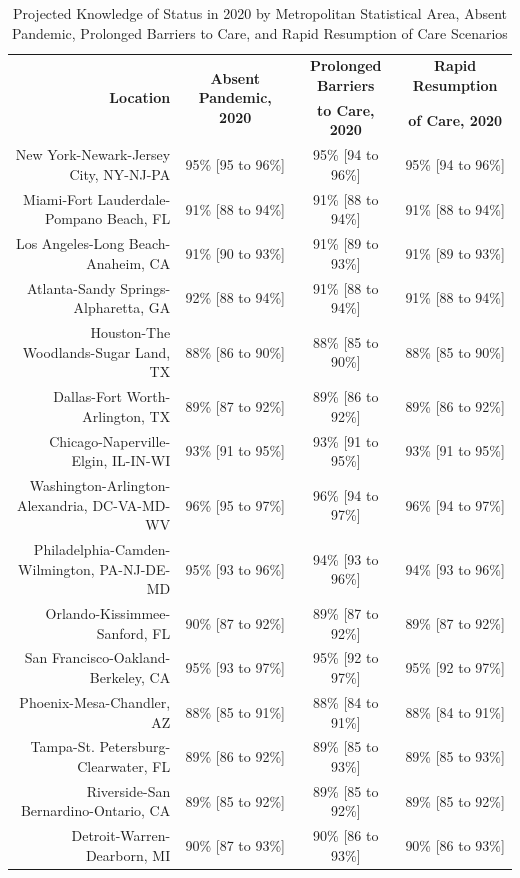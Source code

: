 \documentclass{article}
\begin{document}
\begin{table}[H]
	\caption{Projected Knowledge of Status in 2020 by Metropolitan Statistical Area, Absent Pandemic, Prolonged Barriers to Care, and Rapid Resumption of Care Scenarios}
	\footnotesize
	\begin{tabular}{|r|c|c|c|}
		\hline
		\multirow{2}{*}{\textbf{Location}} & \multirow{2}{*}{\textbf{Absent Pandemic, 2020}} & \textbf{Prolonged Barriers} & \textbf{Rapid Resumption}\\
		&  & \textbf{to Care, 2020} & \textbf{of Care, 2020}\\
		\hline\hline
		New York-Newark-Jersey City, NY-NJ-PA & 95\% [95 to 96\%] & 95\% [94 to 96\%] & 95\% [94 to 96\%]\\
		Miami-Fort Lauderdale-Pompano Beach, FL & 91\% [88 to 94\%] & 91\% [88 to 94\%] & 91\% [88 to 94\%]\\
		Los Angeles-Long Beach-Anaheim, CA & 91\% [90 to 93\%] & 91\% [89 to 93\%] & 91\% [89 to 93\%]\\
		Atlanta-Sandy Springs-Alpharetta, GA & 92\% [88 to 94\%] & 91\% [88 to 94\%] & 91\% [88 to 94\%]\\
		Houston-The Woodlands-Sugar Land, TX & 88\% [86 to 90\%] & 88\% [85 to 90\%] & 88\% [85 to 90\%]\\
		Dallas-Fort Worth-Arlington, TX & 89\% [87 to 92\%] & 89\% [86 to 92\%] & 89\% [86 to 92\%]\\
		Chicago-Naperville-Elgin, IL-IN-WI & 93\% [91 to 95\%] & 93\% [91 to 95\%] & 93\% [91 to 95\%]\\
		Washington-Arlington-Alexandria, DC-VA-MD-WV & 96\% [95 to 97\%] & 96\% [94 to 97\%] & 96\% [94 to 97\%]\\
		Philadelphia-Camden-Wilmington, PA-NJ-DE-MD & 95\% [93 to 96\%] & 94\% [93 to 96\%] & 94\% [93 to 96\%]\\
		Orlando-Kissimmee-Sanford, FL & 90\% [87 to 92\%] & 89\% [87 to 92\%] & 89\% [87 to 92\%]\\
		San Francisco-Oakland-Berkeley, CA & 95\% [93 to 97\%] & 95\% [92 to 97\%] & 95\% [92 to 97\%]\\
		Phoenix-Mesa-Chandler, AZ & 88\% [85 to 91\%] & 88\% [84 to 91\%] & 88\% [84 to 91\%]\\
		Tampa-St. Petersburg-Clearwater, FL & 89\% [86 to 92\%] & 89\% [85 to 93\%] & 89\% [85 to 93\%]\\
		Riverside-San Bernardino-Ontario, CA & 89\% [85 to 92\%] & 89\% [85 to 92\%] & 89\% [85 to 92\%]\\
		Detroit-Warren-Dearborn, MI & 90\% [87 to 93\%] & 90\% [86 to 93\%] & 90\% [86 to 93\%]\\

\end{tabular}
\end{table}
\end{document}
